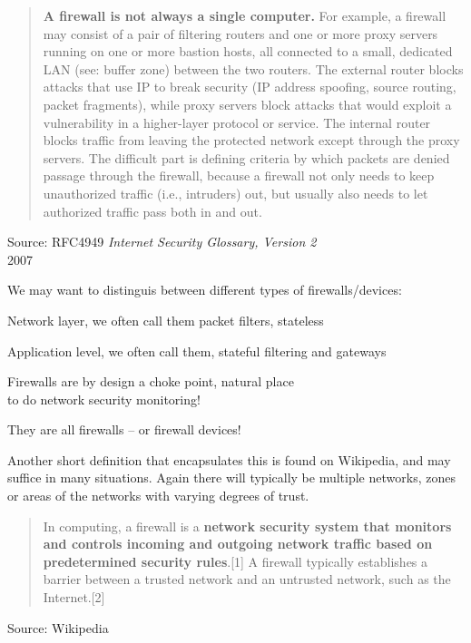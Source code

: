 \documentclass[Screen16to9,17pt]{foils}
\begin{document}
\begin{quote}\small
{\bf A firewall is not always a single computer.} For example, a firewall may consist of a pair of filtering routers and one or more proxy servers running on one or more bastion hosts, all connected to a small, dedicated LAN (see: buffer zone) between the two routers. The external router blocks attacks that use IP to break security (IP address spoofing, source routing, packet fragments), while proxy servers block attacks that would exploit a vulnerability in a higher-layer protocol or service. The internal router blocks traffic from leaving the protected network except through the proxy servers. The difficult part is defining criteria by which packets are denied passage through the firewall, because a firewall not only needs to keep unauthorized traffic (i.e., intruders) out, but usually also needs to let authorized traffic pass both in and out.
\end{quote}
{\footnotesize Source: RFC4949 \emph{Internet Security Glossary, Version 2}\\
 2007}


We may want to distinguis between different types of firewalls/devices:
\begin{list2}
\item Network layer, we often call them packet filters, stateless
\item Application level, we often call them, stateful filtering and gateways
\item Firewalls are by design a choke point, natural place \\
to do network security monitoring!
\end{list2}

They are all firewalls -- or firewall devices!


Another short definition that encapsulates this is found on Wikipedia, and may suffice in many situations. Again there will typically be multiple networks, zones or areas of the networks with varying degrees of trust.
\begin{quote}
In computing, a firewall is a {\bf network security system that monitors and controls incoming and outgoing network traffic based on predetermined security rules}.[1] A firewall typically establishes a barrier between a trusted network and an untrusted network, such as the Internet.[2]
\end{quote}
Source: Wikipedia
\end{document}
